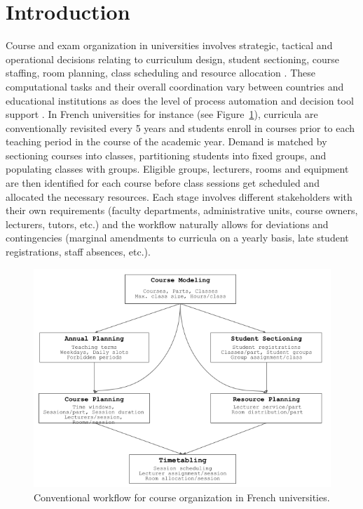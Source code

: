 \section{Introduction}
\label{sec:introduction}

Course and exam organization in universities involves strategic, tactical and operational decisions relating to curriculum design, student sectioning, course staffing, room planning, class scheduling and resource allocation \cite{2019_lindahl_EJOR}. 
These computational tasks and their overall coordination vary between countries and educational institutions as does the level of process automation and decision tool support \cite{2019_oude_AOR}. 
In French universities for instance  (see Figure~\ref{fig:utp-workflow}), curricula are conventionally revisited every 5 years and students enroll in courses prior to each teaching period in the course of the academic year. Demand is matched by sectioning courses into classes, partitioning students into fixed groups, and populating classes with groups. Eligible groups, lecturers, rooms and equipment are then identified for each course before class sessions get scheduled and allocated the necessary resources. 
Each stage involves different stakeholders with their own requirements (faculty departments, administrative units, course owners, lecturers, tutors, etc.) and the workflow naturally allows for deviations and contingencies (marginal amendments to curricula on a yearly basis, late student registrations, staff absences, etc.).

\begin{figure}[h]
\begin{center}
\includegraphics[scale=0.4]{img/utp_workflow.png}
\end{center}
\caption{Conventional workflow for course organization in French universities.}%
\label{fig:utp-workflow}
\end{figure}

